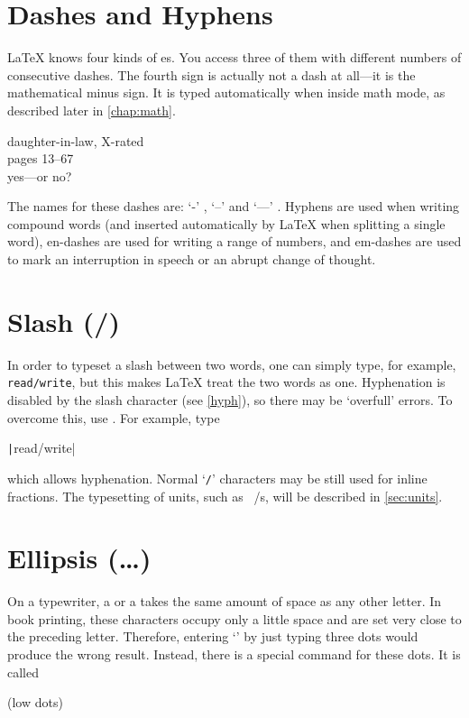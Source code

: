 \section{Dashes and Hyphens}

\LaTeX{} knows four kinds of es. You access three of them with
different numbers of consecutive dashes. The fourth sign is actually not a dash
at all---it is the mathematical minus sign. It is typed automatically when
inside math mode, as described later in \autoref{chap:math}.
\begin{example}
daughter-in-law, X-rated\\
pages 13--67\\
yes---or no?
\end{example}

The names for these dashes are: `-' \index{-}, `--'
\index{--} and `---' \index{---}. Hyphens are used when
writing compound words (and inserted automatically by \LaTeX{} when splitting a
single word), en-dashes are used for writing a range of numbers, and em-dashes
are used to mark an interruption in speech or an abrupt change of thought.

\section{Slash (/)}

In order to typeset a slash between two words, one can simply type, for example,
\texttt{read/write}, but this makes \LaTeX{} treat the two words as one.
Hyphenation is disabled by the slash character (see \autoref{hyph}), so there
may be \enquote*{overfull} errors.  To overcome this, use .
For example, type
\begin{code}
  \texttt|read\slash write|
\end{code}
which allows hyphenation.  Normal
\enquote*{\texttt{/}} characters may be still used for inline fractions.
The typesetting of units, such as \unit[per-mode = symbol]{\mebi\byte\per\s},
will be described in \autoref{sec:units}.

\section{Ellipsis (\ldots)}

On a typewriter, a  or a  takes the same amount of
space as any other letter. In book printing, these characters occupy
only a little space and are set very close to the preceding letter.
Therefore, entering \enquote*{} by just typing three
dots would produce the wrong result. Instead, there is a special
command for these dots. It is called
\begin{lscommand}
   (low dots)
\end{lscommand}

